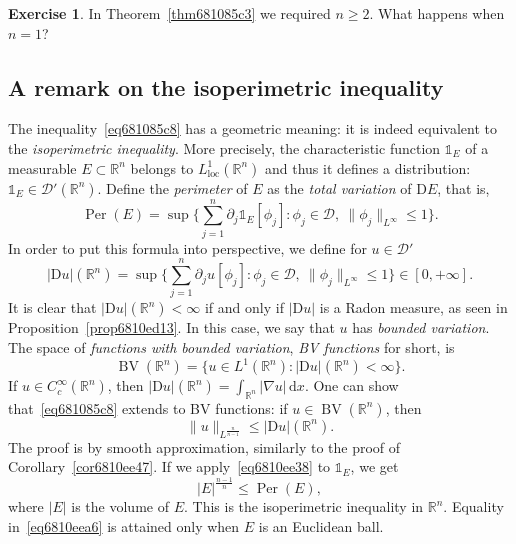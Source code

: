 \documentclass[a4paper,9pt]{amsart}
\newcommand{\scr}[1]{\mathscr{#1}}
\newcommand{\R}{\mathbb{R}}	%
\newcommand{\did}{\,\mathrm{d}}	%
\newcommand{\de}{\partial}		%
\newcommand{\Diff}{\mathrm{D}}
\newcommand{\loc}{\mathrm{loc}}
\newcommand{\grad}{\nabla}
\newcommand{\one}{{\mathds 1\!}}
\theoremstyle{plain}
\theoremstyle{definition}
\newtheorem{exercise}[proposition]{Exercise}%
\theoremstyle{remark}
\begin{document}
\begin{exercise}
	In Theorem~\ref{thm681085c3} we required $n\ge 2$. What happens when $n=1$?
\end{exercise}

\subsection{A remark on the isoperimetric inequality}

The inequality~\eqref{eq681085c8} has a geometric meaning: it is indeed equivalent to the \emph{isoperimetric inequality}.
More precisely, the characteristic function $\one_E$ of a measurable $E\subset\R^n$ belongs to $L^1_\loc(\R^n)$ and thus it defines a distribution: $\one_E\in\scr D'(\R^n)$.
Define the \emph{perimeter} of $E$ as the \emph{total variation} of $\Diff E$, that is,
\begin{equation}
	\operatorname{Per}(E) 
	= \sup\{\sum_{j=1}^n\de_j\one_E[\phi_j] : \phi_j\in\scr D,\ \|\phi_j\|_{L^\infty} \le 1 \} .
\end{equation}
In order to put this formula into perspective, we define for $u\in\scr D'$
\begin{equation}
	|\Diff u|(\R^n)
	= \sup\{\sum_{j=1}^n\de_ju[\phi_j] : \phi_j\in\scr D,\ \|\phi_j\|_{L^\infty} \le 1 \} \in [0,+\infty] .
\end{equation}
It is clear that $|\Diff u|(\R^n)<\infty$ if and only if $|\Diff u|$ is a Radon measure, as seen in Proposition~\ref{prop6810ed13}.
In this case, we say that $u$ has \emph{bounded variation}.
The space of \emph{functions with bounded variation}, \emph{BV functions} for short,
is 
\begin{equation}
	\operatorname{BV}(\R^n)
	= \{u\in L^1(\R^n) : |\Diff u|(\R^n)<\infty \} .
\end{equation}
If $u\in C^\infty_c(\R^n)$, then $|\Diff u|(\R^n) = \int_{\R^n} |\grad u| \did x$.
One can show that~\eqref{eq681085c8} extends to BV functions: if $u\in \operatorname{BV}(\R^n)$, then
\begin{equation}\label{eq6810ee38}
	\|u\|_{L^{\frac{n}{n-1}}} \le |\Diff u|(\R^n) .
\end{equation}
The proof is by smooth approximation, similarly to the proof of Corollary~\ref{cor6810ee47}.
If we apply~\eqref{eq6810ee38} to $\one_E$, we get
\begin{equation}\label{eq6810eea6}
	|E|^{\frac{n-1}{n}} \le \operatorname{Per}(E) ,
\end{equation}
where $|E|$ is the volume of $E$.
This is the isoperimetric inequality in $\R^n$. 
Equality in~\eqref{eq6810eea6} is attained only when $E$ is an Euclidean ball.
\end{document}
